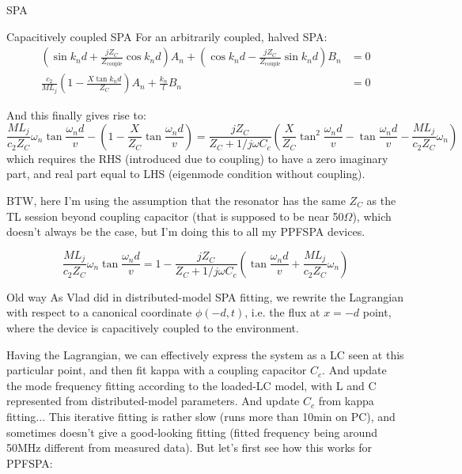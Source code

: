 \documentclass[12pt,a4paper]{article}
\begin{document}
\begin{section}{SPA}
\begin{subsection}{Capacitively coupled SPA}
For an arbitrarily coupled, halved SPA:
\begin{equation*}
\begin{aligned}
\left(\sin{k_n d} + \frac{j Z_C}{Z_\mathrm{couple}} \cos{k_n d}\right) A_n + \left(\cos{k_n d} - \frac{j Z_C}{Z_\mathrm{couple}} \sin{k_n d}\right) B_n &= 0\\
\frac{c_2}{M L_j}\left( 1 - \frac{X \tan{k_n d}}{Z_C}\right)A_n + \frac{k_n}{l}B_n &= 0
\end{aligned}
\end{equation*}


And this finally gives rise to: 
\begin{equation}\label{eq:full}
\frac{M L_j}{c_2 Z_C}\omega_n\tan{\frac{\omega_n d}{v}} -\left(1 - \frac{X}{Z_C} \tan{\frac{\omega_n d}{v}}\right) = \frac{j Z_C}{Z_C + 1/j\omega C_c}\left(\frac{X}{Z_C}\tan^2{\frac{\omega_n d}{v}} - \tan{\frac{\omega_n d}{v}} - \frac{M L_j}{c_2 Z_C}\omega_n\right)
\end{equation}
which requires the RHS (introduced due to coupling) to have a zero imaginary part, and real part equal to LHS (eigenmode condition without coupling). 

BTW, here I'm using the assumption that the resonator has the same $Z_C$ as the TL session beyond coupling capacitor (that is supposed to be near 50$\Omega$), which doesn't always be the case, but I'm doing this to all my PPFSPA devices. 

\begin{equation}\label{eq:full'}
\frac{M L_j}{c_2 Z_C}\omega_n\tan{\frac{\omega_n d}{v}} = 1 - \frac{j Z_C}{Z_C + 1/j\omega C_c}\left(\tan{\frac{\omega_n d}{v}} + \frac{M L_j}{c_2 Z_C}\omega_n\right)
\end{equation}



\end{subsection}



\begin{subsection}{Old way}
As Vlad did in distributed-model SPA fitting, we rewrite the Lagrangian with respect to a canonical coordinate $\phi(-d, t)$, i.e. the flux at $x=-d$ point, where the device is capacitively coupled to the environment. 

Having the Lagrangian, we can effectively express the system as a LC seen at this particular point, and then fit kappa with a coupling capacitor $C_c$. And update the mode frequency fitting according to the loaded-LC model, with L and C represented from distributed-model parameters. And update $C_c$ from kappa fitting...
This iterative fitting is rather slow (runs more than 10min on PC), and sometimes doesn't give a good-looking fitting (fitted frequency being around 50MHz different from measured data). But let's first see how this works for PPFSPA: 


\end{subsection}
\end{section}
\end{document}
